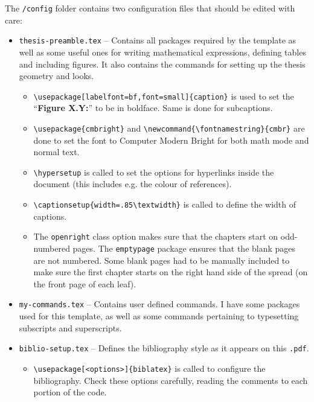 The \texttt{/config} folder contains two configuration files that should be edited with care:
%
\begin{itemize}
\item \texttt{thesis-preamble.tex} -- Contains all packages required by the template as well as some useful ones for writing mathematical expressions, defining tables and including figures. It also contains the commands for setting up the thesis geometry and looks.

\begin{itemize}
	\item \Verb*|\usepackage[labelfont=bf,font=small]{caption}| is used to set the ``\textbf{Figure X.Y:}'' to be in boldface. Same is done for subcaptions.
	\item \Verb*|\usepackage{cmbright}| and \Verb*|\newcommand{\fontnamestring}{cmbr}| are done to set the font to Computer Modern Bright for both math mode and normal text.
	\item \Verb*|\hypersetup| is called to set the options for hyperlinks inside the document (this includes e.g. the colour of references).
	\item \Verb*|\captionsetup{width=.85\textwidth}| is called to define the width of captions.
	\item The \Verb*|openright| class option makes sure that the chapters start on odd-numbered pages. The \Verb*|emptypage| package ensures that the blank pages are not numbered. Some blank pages had to be manually included to make sure the first chapter starts on the right hand side of the spread (on the front page of each leaf).
\end{itemize}


\item \texttt{my-commands.tex} -- Contains user defined commands. I have some packages used for this template, as well as some commands pertaining to typesetting subscripts and superscripts.

\item \texttt{biblio-setup.tex} -- Defines the bibliography style as it appears on this \texttt{.pdf}.
\begin{itemize}
	\item \Verb*|\usepackage[<options>]{biblatex}| is called to configure the bibliography. Check these options carefully, reading the comments to each portion of the code.
\end{itemize}

\end{itemize}

